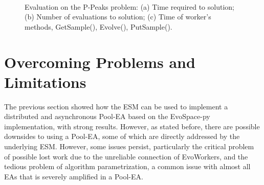 \begin{figure}[t]
    \centering
    \\
    \caption{Evaluation on the P-Peaks problem:
    (a) Time required to solution;
    (b) Number of evaluations to solution; (c) Time of worker's methods, GetSample(), Evolve(), PutSample().}
    \label{fig:effort_real_time}
\end{figure}




\section{Overcoming Problems and Limitations}
\label{sec:overcome}
The previous section showed how the ESM can be used to implement a distributed and asynchronous Pool-EA based on the EvoSpace-py implementation,
with strong results.
However, as stated before, there are possible downsides to using a Pool-EA, some of which are directly addressed by the underlying ESM.
However, some issues persist, particularly the critical problem of possible lost work due to the unreliable connection of EvoWorkers,
and the tedious problem of algorithm parametrization, a common issue with almost all EAs that is severely amplified in a Pool-EA.

